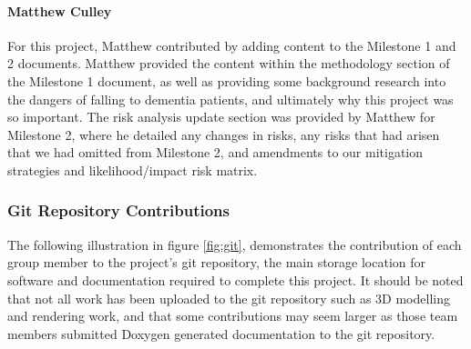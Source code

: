                 \paragraph{Matthew Culley}\mbox{}

                For this project, Matthew contributed by adding content to the Milestone 1 and 2 documents. Matthew provided the content within the methodology section of the Milestone 1 document, as well as providing some background research into the dangers of falling to dementia patients, and ultimately why this project was so important. The risk analysis update section was provided by Matthew for Milestone 2, where he detailed any changes in risks, any risks that had arisen that we had omitted from Milestone 2, and amendments to our mitigation strategies and likelihood/impact risk matrix.

            \subsubsection{Git Repository Contributions}

                The following illustration in figure \ref{fig:git}, demonstrates the contribution of each group member to the project's git repository, the main storage location for software and documentation required to complete this project. It should be noted that not all work has been uploaded to the git repository such as 3D modelling and rendering work, and that some contributions may seem larger as those team members submitted Doxygen generated documentation to the git repository.

                